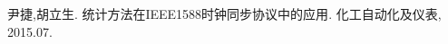 
\begin{publications}{99}
    \item\textsc{尹捷,胡立生}. {统计方法在IEEE1588时钟同步协议中的应用}. 化工自动化及仪表, 2015.07.
\end{publications}
